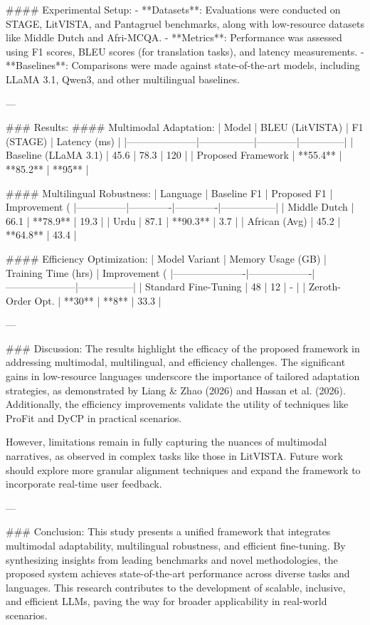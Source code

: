 #### Experimental Setup:
- **Datasets**: Evaluations were conducted on STAGE, LitVISTA, and Pantagruel benchmarks, along with low-resource datasets like Middle Dutch and Afri-MCQA.
- **Metrics**: Performance was assessed using F1 scores, BLEU scores (for translation tasks), and latency measurements.
- **Baselines**: Comparisons were made against state-of-the-art models, including LLaMA 3.1, Qwen3, and other multilingual baselines.

---

### Results:
#### Multimodal Adaptation:
| Model               | BLEU (LitVISTA) | F1 (STAGE) | Latency (ms) |
|---------------------|-----------------|------------|--------------|
| Baseline (LLaMA 3.1) | 45.6           | 78.3       | 120          |
| Proposed Framework   | **55.4**       | **85.2**   | **95**       |

#### Multilingual Robustness:
| Language      | Baseline F1 | Proposed F1 | Improvement (%
|---------------|-------------|-------------|-----------------|
| Middle Dutch  | 66.1        | **78.9**    | 19.3            |
| Urdu          | 87.1        | **90.3**    | 3.7             |
| African (Avg) | 45.2        | **64.8**    | 43.4            |

#### Efficiency Optimization:
| Model Variant        | Memory Usage (GB) | Training Time (hrs) | Improvement (%
|----------------------|-------------------|---------------------|-----------------|
| Standard Fine-Tuning | 48                | 12                  | -               |
| Zeroth-Order Opt.    | **30**            | **8**               | 33.3            |

---

### Discussion:
The results highlight the efficacy of the proposed framework in addressing multimodal, multilingual, and efficiency challenges. The significant gains in low-resource languages underscore the importance of tailored adaptation strategies, as demonstrated by Liang & Zhao (2026) and Hassan et al. (2026). Additionally, the efficiency improvements validate the utility of techniques like ProFit and DyCP in practical scenarios.

However, limitations remain in fully capturing the nuances of multimodal narratives, as observed in complex tasks like those in LitVISTA. Future work should explore more granular alignment techniques and expand the framework to incorporate real-time user feedback.

---

### Conclusion:
This study presents a unified framework that integrates multimodal adaptability, multilingual robustness, and efficient fine-tuning. By synthesizing insights from leading benchmarks and novel methodologies, the proposed system achieves state-of-the-art performance across diverse tasks and languages. This research contributes to the development of scalable, inclusive, and efficient LLMs, paving the way for broader applicability in real-world scenarios.

